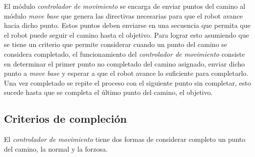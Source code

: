 





El módulo \emph{controlador de movimiento} se encarga de enviar puntos del
camino al módulo \emph{move base} que genera las directivas necesarias para que
el robot avance hacia dicho punto. Estos puntos deben enviarse en una secuencia
que permita que el robot puede seguir el camino hasta el objetivo. Para lograr
esto asumiendo que se tiene un criterio que permite considerar cuando un punto del camino se
considera completado, el funcionamiento del \emph{controlador de
movimiento} consiste en determinar el primer punto no completado del camino
asignado, enviar dicho punto a \emph{move base} y esperar a que el robot avance
lo suficiente para completarlo. Una vez completado se repite el
proceso con el siguiente punto sin completar, esto sucede hasta que se completa
el último punto del camino, el objetivo.


\subsection{Criterios de compleción}

El \emph{controlador de movimiento} tiene dos formas de considerar completo un
punto del camino, la normal y la forzosa.

